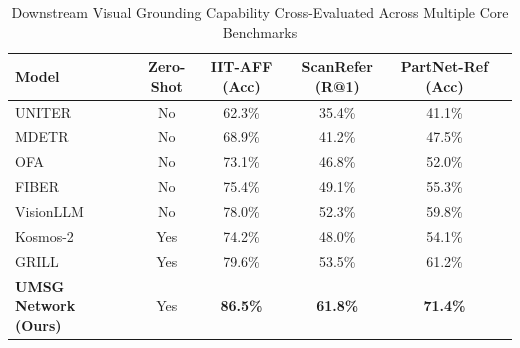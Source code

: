 \begin{table}[t!]
\centering
\caption{Downstream Visual Grounding Capability Cross-Evaluated Across Multiple Core Benchmarks}
\label{tab:table4_downstream_grounding}
\begin{tabular*}{\textwidth}{l@{\extracolsep{\fill}}ccccc}
\toprule
\textbf{Model} & \textbf{Zero-Shot} & \textbf{IIT-AFF (Acc)} & \textbf{ScanRefer (R@1)} & \textbf{PartNet-Ref (Acc)} \\
\midrule
UNITER       & No  & 62.3\% & 35.4\% & 41.1\% \\
MDETR        & No  & 68.9\% & 41.2\% & 47.5\% \\
OFA          & No  & 73.1\% & 46.8\% & 52.0\% \\
FIBER        & No  & 75.4\% & 49.1\% & 55.3\% \\
VisionLLM    & No  & 78.0\% & 52.3\% & 59.8\% \\
\midrule
Kosmos-2     & Yes & 74.2\% & 48.0\% & 54.1\% \\
GRILL        & Yes & 79.6\% & 53.5\% & 61.2\% \\
\textbf{UMSG Network (Ours)} & Yes & \textbf{86.5\%} & \textbf{61.8\%} & \textbf{71.4\%} \\
\bottomrule
\end{tabular*}
\end{table}
